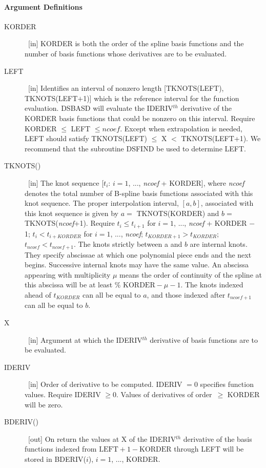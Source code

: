 \documentclass[twoside]{MATH77}
\begin{document}
\paragraph{Argument Definitions}
\begin{description}
\item[KORDER]  \ [in] KORDER is both the order of the spline basis functions
and the number of basis functions whose derivatives are to be evaluated.

\item[LEFT]  \ [in] Identifies an interval of nonzero length [TKNOTS(LEFT),
TKNOTS(LEFT$+$1)] which is the reference interval for the function
evaluation. DSBASD will evaluate the IDERIV$^{th}$ derivative of the KORDER
basis functions that could be nonzero on this interval. Require KORDER $\leq
$ LEFT $\leq ncoef.$ Except when extrapolation is needed, LEFT should
satisfy TKNOTS(LEFT) $\leq $ X $<$ TKNOTS(LEFT+1). We recommend that the
subroutine DSFIND be used to determine LEFT.

\item[TKNOTS()]  \ [in] The knot sequence [$t_i$: $i=1$, ..., {\em ncoef} +
KORDER], where {\em ncoef} denotes the total number of B-spline basis functions
associated with this knot sequence. The proper interpolation interval, $[a,b]
$, associated with this knot sequence is given by $a=$ TKNOTS(KORDER) and $b=
$ TKNOTS({\em ncoef}+1). Require $t_i\leq t_{i+1}$ for $i=1$, ..., {\em ncoef} +
KORDER $-$ 1; $t_i<t_{i+KORDER}$ for $i=1$, ..., {\em ncoef}; $%
t_{KORDER+1}>t_{KORDER}$; $t_{ncoef}<t_{ncoef+1}$. The knots strictly
between a and $b$ are internal knots. They specify abscissae at which one
polynomial piece ends and the next begins. Successive internal knots may
have the same value. An abscissa appearing with multiplicity $\mu $ means the
order of continuity of the spline at this abscissa will be at least $\text{%
KORDER}-\mu -1$. The knots indexed ahead of $t_{KORDER}$ can all be equal to
$a$, and those indexed after $t_{ncoef+1}$ can all be equal to $b.$

\item[X]  \ [in] Argument at which the IDERIV$^{th}$ derivative of basis
functions are to be evaluated.

\item[IDERIV]  \ [in] Order of derivative to be computed. IDERIV $=0$
specifies function values. Require IDERIV $\geq 0$. Values of derivatives of
order\ $\geq $ KORDER will be zero.

\item[BDERIV()]  \ [out] On return the values at X of the IDERIV$^{th}$
derivative of the basis functions indexed from $\text{LEFT}+1-\text{KORDER}$
through LEFT will be stored in BDERIV($i$), $i=1$, ..., KORDER.
\end{description}
\end{document}
